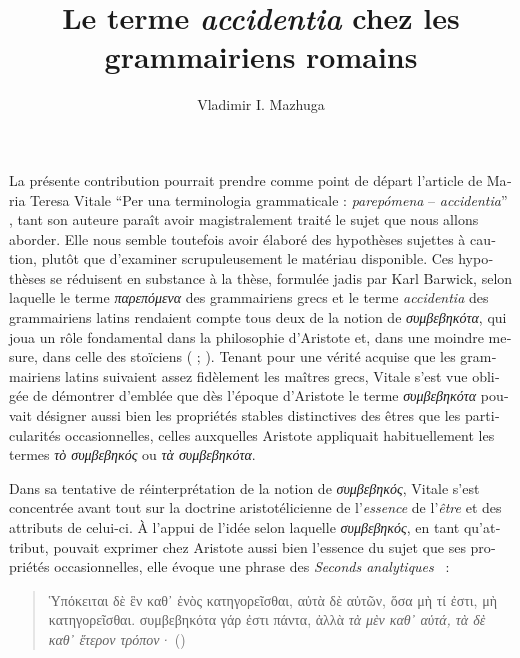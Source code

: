 \documentclass[french,output=paper,colorlinks,citecolor=brown]{../langscibook}
\title{Le terme \textit{accidentia} chez les grammairiens romains}
\author{Vladimir I. Mazhuga\affiliation{Saint Petersburg Institute of History, RAS}}
\begin{document}
\begin{otherlanguage}{french}
\maketitle

La présente contribution pourrait prendre comme point de départ l’article de Maria Teresa Vitale “Per una terminologia grammaticale : \textit{parepómena} – \textit{accidentia}” \citep{Vitale1982}, tant son auteure paraît avoir magistralement traité le sujet que nous allons aborder. Elle nous semble toutefois avoir élaboré des hypothèses sujettes à caution, plutôt que d’examiner scrupuleusement le matériau disponible. Ces hypothèses se réduisent en substance à la thèse, formulée jadis par Karl Barwick, selon laquelle le terme \textit{παρεπόμενα} des grammairiens grecs et le terme \textit{accidentia} des grammairiens latins rendaient compte tous deux de la notion de \textit{συμβεβηκότα}, qui joua un rôle fondamental dans la philosophie d’Aristote et, dans une moindre mesure, dans celle des stoïciens (\citealt[107--108]{Barwick1922} ; \citealt[212–214]{Vitale1982}). Tenant pour une vérité acquise que les grammairiens latins suivaient assez fidèlement les maîtres grecs, Vitale s’est vue obligée de démontrer d’emblée que dès l’époque d’Aristote le terme \textit{συμβεβηκότα} pouvait désigner aussi bien les propriétés stables distinctives des êtres que les particularités occasionnelles, celles auxquelles Aristote appliquait habituellement les termes \textit{τὸ συμβεβηκός} ou \textit{τὰ συμβεβηκότα}. 

Dans sa tentative de réinterprétation de la notion de \textit{συμβεβηκός}, Vitale s’est concentrée avant tout sur la doctrine aristotélicienne de l’\textit{essence} de l’\textit{être} et des attributs de celui-ci. À l’appui de l’idée selon laquelle \textit{συμβεβηκός}, en tant qu’attribut, pouvait exprimer chez Aristote aussi bien l’essence du sujet que ses propriétés occasionnelles, elle évoque une phrase des \textit{Seconds analytiques~} :

\begin{quote}
    Ὑπόκειται δὲ ἓν καθ᾿ ἑνὸς κατηγορεῖσθαι, αὐτὰ δὲ αὐτῶν, ὅσα μὴ τί ἐστι, μὴ κατηγορεῖσθαι. συμβεβηκότα γάρ ἐστι πάντα, ἀλλὰ \textit{τὰ μὲν καθ᾿ αὑτά, τὰ δὲ καθ᾿ ἕτερον τρόπον·} ()


\end{quote}
\end{otherlanguage}
\end{document}

